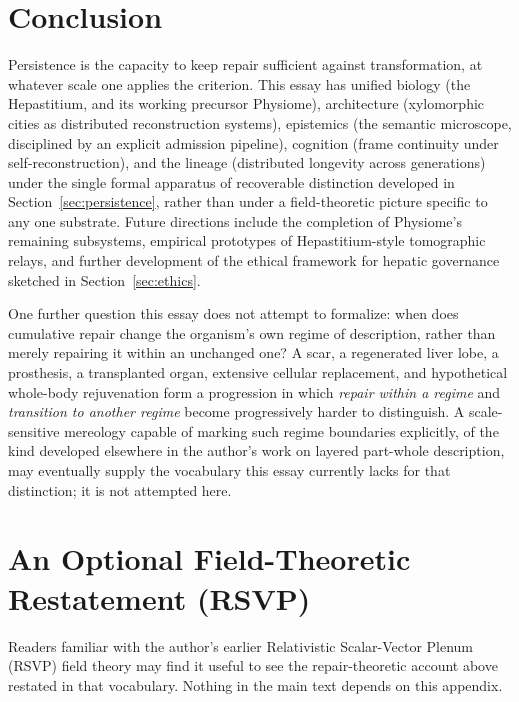 \documentclass[12pt]{article}
\begin{document}
\section{Conclusion}

Persistence is the capacity to keep repair sufficient against transformation, at whatever scale one applies the criterion. This essay has unified biology (the Hepastitium, and its working precursor Physiome), architecture (xylomorphic cities as distributed reconstruction systems), epistemics (the semantic microscope, disciplined by an explicit admission pipeline), cognition (frame continuity under self-reconstruction), and the lineage (distributed longevity across generations) under the single formal apparatus of recoverable distinction developed in Section~\ref{sec:persistence}, rather than under a field-theoretic picture specific to any one substrate. Future directions include the completion of Physiome's remaining subsystems, empirical prototypes of Hepastitium-style tomographic relays, and further development of the ethical framework for hepatic governance sketched in Section~\ref{sec:ethics}.

One further question this essay does not attempt to formalize: when does cumulative repair change the organism's own regime of description, rather than merely repairing it within an unchanged one? A scar, a regenerated liver lobe, a prosthesis, a transplanted organ, extensive cellular replacement, and hypothetical whole-body rejuvenation form a progression in which \emph{repair within a regime} and \emph{transition to another regime} become progressively harder to distinguish. A scale-sensitive mereology capable of marking such regime boundaries explicitly, of the kind developed elsewhere in the author's work on layered part-whole description, may eventually supply the vocabulary this essay currently lacks for that distinction; it is not attempted here.

\appendix

\section{An Optional Field-Theoretic Restatement (RSVP)}
\label{app:rsvp}

Readers familiar with the author's earlier Relativistic Scalar-Vector Plenum (RSVP) field theory may find it useful to see the repair-theoretic account above restated in that vocabulary. Nothing in the main text depends on this appendix.
\end{document}
